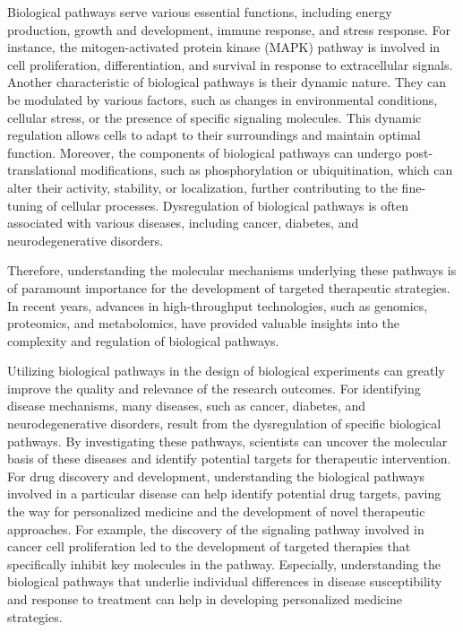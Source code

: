 
Biological pathways serve various essential functions, including energy production, growth and development, immune response, and stress response. For instance, the mitogen-activated protein kinase (MAPK) pathway is involved in cell proliferation, differentiation, and survival in response to extracellular signals. Another characteristic of biological pathways is their dynamic nature. They can be modulated by various factors, such as changes in environmental conditions, cellular stress, or the presence of specific signaling molecules. This dynamic regulation allows cells to adapt to their surroundings and maintain optimal function. Moreover, the components of biological pathways can undergo post-translational modifications, such as phosphorylation or ubiquitination, which can alter their activity, stability, or localization, further contributing to the fine-tuning of cellular processes. Dysregulation of biological pathways is often associated with various diseases, including cancer, diabetes, and neurodegenerative disorders. 
 
Therefore, understanding the molecular mechanisms underlying these pathways is of paramount importance for the development of targeted therapeutic strategies. In recent years, advances in high-throughput technologies, such as genomics, proteomics, and metabolomics, have provided valuable insights into the complexity and regulation of biological pathways.


Utilizing biological pathways in the design of biological experiments can greatly improve the quality and relevance of the research outcomes. For identifying disease mechanisms, many diseases, such as cancer, diabetes, and neurodegenerative disorders, result from the dysregulation of specific biological pathways. By investigating these pathways, scientists can uncover the molecular basis of these diseases and identify potential targets for therapeutic intervention. For drug discovery and development, understanding the biological pathways involved in a particular disease can help identify potential drug targets, paving the way for personalized medicine and the development of novel therapeutic approaches. For example, the discovery of the signaling pathway involved in cancer cell proliferation led to the development of targeted therapies that specifically inhibit key molecules in the pathway. Especially, understanding the biological pathways that underlie individual differences in disease susceptibility and response to treatment can help in developing personalized medicine strategies.

